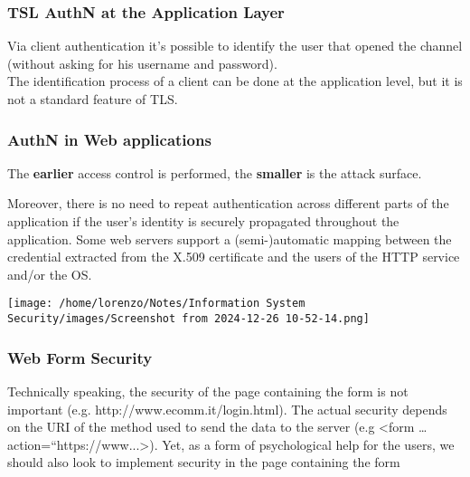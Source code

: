 \begin{customquote}
\vspace{-0.4cm}
\subsubsection{TSL AuthN at the Application Layer}
Via client authentication it’s possible to identify the user that opened the channel (without asking for his username and password).\\
The identification process of a client can be done at the application level, but it is not a
standard feature of TLS.
\end{customquote}

\begin{customquote}
\vspace{-0.4cm}
\subsubsection{AuthN in Web applications}
\begin{quotebox-yellow}{}
The \textbf{earlier} access control is performed, the \textbf{smaller} is the attack surface.
\end{quotebox-yellow}
\begin{minipage}{0.4\textwidth}
\vspace{-1cm}
Moreover, there is no need to repeat authentication across different parts of the application if the user's identity is securely propagated throughout the application. Some web servers support a (semi-)automatic mapping 
between the credential extracted from the X.509 certificate and the users of the HTTP service and/or the OS.
\end{minipage} 
\hspace{0cm}
\begin{minipage}{0.5\textwidth}
    \centering
    \texttt{[image: /home/lorenzo/Notes/Information System Security/images/Screenshot from 2024-12-26 10-52-14.png]}
\end{minipage}
\end{customquote}

\begin{customquote}
\vspace{-0.4cm}
\subsubsection{Web Form Security}
Technically speaking, the security of the page containing the form is not important (e.g. http://www.ecomm.it/login.html). The actual security depends on the URI of the method used to send the data to the server (e.g <form … action=“https://www...>).
Yet, as a form of psychological help for the users, we should also look to implement security in the page containing the form
\end{customquote}

